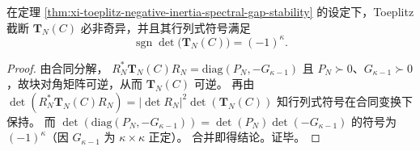 \begin{corollary}[稳定层级的非奇异性与行列式符号]\label{cor:xi-toeplitz-determinant-sign-rigidity}
在定理 \ref{thm:xi-toeplitz-negative-inertia-spectral-gap-stability} 的设定下，Toeplitz 截断 \(\mathbf{T}_N(C)\) 必非奇异，并且其行列式符号满足
\[
\boxed{\;
\operatorname{sgn}\det\!\bigl(\mathbf{T}_N(C)\bigr)=(-1)^{\kappa}. \;}
\]
\end{corollary}
\begin{proof}
由合同分解，
\(
R_N^{\ast}\mathbf{T}_N(C)R_N=\mathrm{diag}(P_N,-G_{\kappa-1})
\)
且 \(P_N\succ 0\)、\(G_{\kappa-1}\succ 0\)，故块对角矩阵可逆，从而 \(\mathbf{T}_N(C)\) 可逆。
再由
\(
\det(R_N^{\ast}\mathbf{T}_N(C)R_N)=|\det R_N|^2\det(\mathbf{T}_N(C))
\)
知行列式符号在合同变换下保持。
而
\(
\det(\mathrm{diag}(P_N,-G_{\kappa-1}))=\det(P_N)\det(-G_{\kappa-1})
\)
的符号为 \((-1)^{\kappa}\)（因 \(G_{\kappa-1}\) 为 \(\kappa\times\kappa\) 正定）。
合并即得结论。证毕。
\end{proof}

